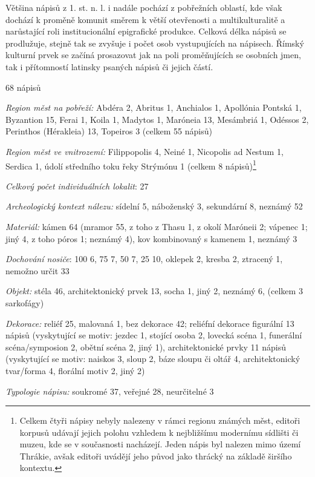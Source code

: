 Většina nápisů z 1. st. n. l. i nadále pochází z pobřežních oblastí, kde však dochází k proměně komunit směrem k větší otevřenosti a multikulturalitě a narůstající roli institucionální epigrafické produkce. Celková délka nápisů se prodlužuje, stejně tak se zvyšuje i počet osob vystupujících na nápisech. Římský kulturní prvek se začíná prosazovat jak na poli proměňujících se osobních jmen, tak i přítomností latinsky psaných nápisů či jejich částí.

\placetable[none]{}
\starttable[|l|]
\HL
{} 68 nápisů

{\em Region měst na pobřeží:} Abdéra 2, Abritus 1, Anchialos 1, Apollónia Pontská 1, Byzantion 15, Ferai 1, Koila 1, Madytos 1, Maróneia 13, Mesámbriá 1, Odéssos 2, Perinthos (Hérakleia) 13, Topeiros 3 (celkem 55 nápisů)

{\em Region měst ve vnitrozemí:} Filippopolis 4, Neiné 1, Nicopolis ad Nestum 1, Serdica 1, údolí středního toku řeky Strýmónu 1 (celkem 8 nápisů)\footnote{Celkem čtyři nápisy nebyly nalezeny v rámci regionu známých měst, editoři korpusů udávají jejich polohu vzhledem k nejbližšímu modernímu sídlišti či muzeu, kde se v současnosti nacházejí. Jeden nápis byl nalezen mimo území Thrákie, avšak editoři uvádějí jeho původ jako thrácký na základě širšího kontextu.}

{\em Celkový počet individuálních lokalit}: 27

{\em Archeologický kontext nálezu:} sídelní 5, náboženský 3, sekundární 8, neznámý 52

{\em Materiál:} kámen 64 (mramor 55, z toho z Thasu 1, z okolí Maróneii 2; vápenec 1; jiný 4, z toho póros 1; neznámý 4), kov kombinovaný s kamenem 1, neznámý 3

{\em Dochování nosiče}: 100  6, 75  7, 50  7, 25  10, oklepek 2, kresba 2, ztracený 1, nemožno určit 33

{\em Objekt:} stéla 46, architektonický prvek 13, socha 1, jiný 2, neznámý 6, (celkem 3 sarkofágy)

{\em Dekorace:} reliéf 25, malovaná 1, bez dekorace 42; reliéfní dekorace figurální 13 nápisů (vyskytující se motiv: jezdec 1, stojící osoba 2, lovecká scéna 1, funerální scéna/symposion 2, obětní scéna 2, jiný 1), architektonické prvky 11 nápisů (vyskytující se motiv: naiskos 3, sloup 2, báze sloupu či oltář 4, architektonický tvar/forma 4, florální motiv 2, jiný 2)

{\em Typologie nápisu:} soukromé 37, veřejné 28, neurčitelné 3

